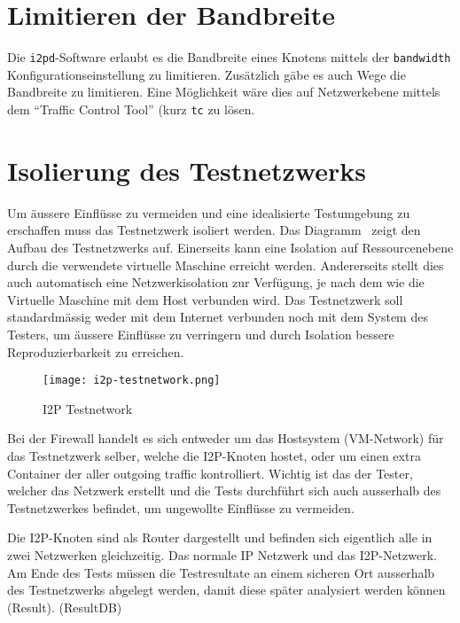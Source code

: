 \section{Limitieren der Bandbreite}

Die \lstinline|i2pd|-Software erlaubt es die Bandbreite eines Knotens  mittels der \lstinline|bandwidth| Konfigurationseinstellung  zu limitieren. \parencite{noauthor_i2p_nodate-3}
Zusätzlich gäbe es auch Wege die Bandbreite zu limitieren.
Eine Möglichkeit wäre dies auf Netzwerkebene mittels dem ``Traffic Control Tool'' (kurz \lstinline|tc| zu lösen.

\section{Isolierung des Testnetzwerks}
\label{sec:isolierung}

Um äussere Einflüsse zu vermeiden und eine idealisierte Testumgebung zu erschaffen muss das Testnetzwerk isoliert werden.
Das Diagramm~ zeigt den Aufbau des Testnetzwerks auf.
Einerseits kann eine Isolation auf Ressourcenebene durch die verwendete virtuelle Maschine erreicht werden.
Andererseits stellt dies auch automatisch eine Netzwerkisolation zur Verfügung, je nach dem wie die Virtuelle Maschine mit dem Host verbunden wird.
Das Testnetzwerk soll standardmässig weder mit dem Internet verbunden noch mit dem System des Testers, um äussere Einflüsse zu verringern und durch Isolation bessere Reproduzierbarkeit zu erreichen.

\begin{figure*}[ht]
  \texttt{[image: i2p-testnetwork.png]}
  \caption{I2P Testnetwork}\label{fig:i2p-testnetwork}
\end{figure*}

Bei der Firewall handelt es sich entweder um das Hostsystem (VM-Network) für das Testnetzwerk selber, welche die I2P-Knoten hostet, oder um einen extra Container der aller outgoing traffic kontrolliert.
Wichtig ist das der Tester, welcher das Netzwerk erstellt und die Tests durchführt sich auch ausserhalb des Testnetzwerkes befindet, um ungewollte Einflüsse zu vermeiden.

Die I2P-Knoten sind als Router dargestellt und befinden sich eigentlich alle in zwei Netzwerken gleichzeitig. Das normale IP Netzwerk und das I2P-Netzwerk.
Am Ende des Tests müssen die Testresultate an einem sicheren Ort ausserhalb des Testnetzwerks abgelegt werden, damit diese später analysiert werden können (Result). (ResultDB)

